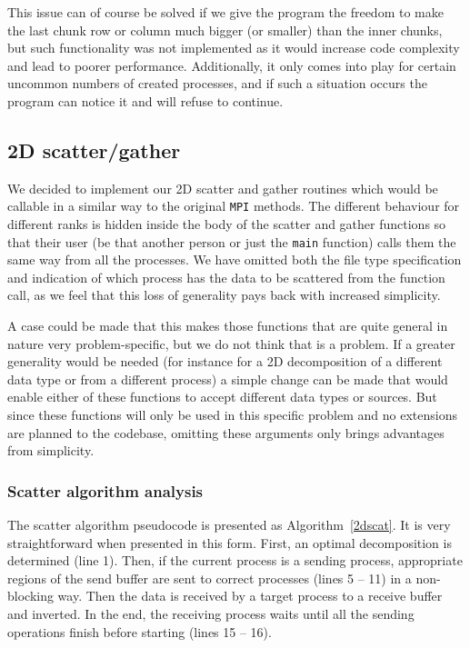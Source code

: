 \documentclass[11pt,a4paper]{article}
\begin{document}
This issue can of course be solved if we give the program the freedom to make the last chunk row or column much bigger (or smaller) than the inner chunks, but such functionality was not implemented as it would increase code complexity and lead to poorer performance. 
Additionally, it only comes into play for certain uncommon numbers of created processes, and if such a situation occurs the program can notice it and will refuse to continue.

\subsection{2D scatter/gather}
\label{sec:2dscatgat}
We decided to implement our 2D scatter and gather routines which would be callable in a similar way to the original \texttt{MPI} methods. 
The different behaviour for different ranks is hidden inside the body of the scatter and gather functions so that their user (be that another person or just the \texttt{main} function) calls them the same way from all the processes. 
We have omitted both the file type specification and indication of which process has the data to be scattered from the function call, as we feel that this loss of generality pays back with increased simplicity. 

A case could be made that this makes those functions that are quite general in nature very problem-specific, but we do not think that is a problem. 
If a greater generality would be needed (for instance for a 2D decomposition of a different data type or from a different process) a simple change can be made that would enable either of these functions to accept different data types or sources. 
But since these functions will only be used in this specific problem and no extensions are planned to the codebase, omitting these arguments only brings advantages from simplicity.

\subsubsection{Scatter algorithm analysis}
The scatter algorithm pseudocode is presented as Algorithm~\ref{2dscat}. 
It is very straightforward when presented in this form. First, an optimal decomposition is determined (line 1). 
Then, if the current process is a sending process, appropriate regions of the send buffer are sent to correct processes (lines 5 -- 11) in a non-blocking way. 
Then the data is received by a target process to a receive buffer and inverted. In the end, the receiving process waits until all the sending operations finish before starting (lines 15 -- 16).
\end{document}
